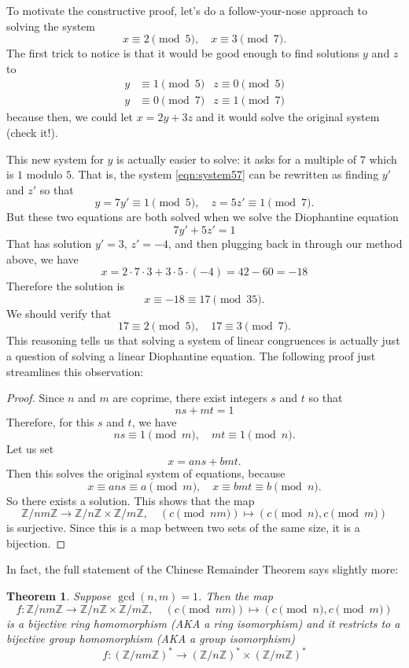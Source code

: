 \documentclass{article}
\theoremstyle{plain}
\newtheorem{theorem}{Theorem}
\theoremstyle{definition}
\theoremstyle{remark}
\numberwithin{theorem}{section}
\newcommand{\ZZ}{\mathbb{Z}}
\begin{document}
To motivate the constructive proof, let's do a follow-your-nose approach to solving the system
\[
x \equiv 2 \pmod{5}, \quad x \equiv 3 \pmod{7}.
\]
The first trick to notice is that it would be good enough to find solutions $y$ and $z$ to
\begin{align}
\label{eqn:system57}
y &\equiv 1 \pmod 5 & z \equiv 0 \pmod 5 \\
y &\equiv 0 \pmod 7 & z \equiv 1 \pmod 7
\end{align}
because then, we could let $x = 2y + 3z$ and it would solve the original system (check it!).

This new system for $y$ is actually easier to solve:  it asks for a multiple of $7$ which is $1$ modulo $5$.  That is, the system \eqref{eqn:system57} can be rewritten as finding $y'$ and $z'$ so that
\[
y  = 7y' \equiv 1 \pmod{5}, \quad z = 5z' \equiv 1 \pmod{7}.
\]
But these two equations are both solved when we solve the Diophantine equation
\[
7y' + 5z' = 1
\]
That has solution $y'= 3$, $z' = -4$, and then plugging back in through our method above, we have
\[
x =  2 \cdot 7 \cdot 3 + 3 \cdot 5 \cdot (-4) = 42 - 60 = -18
\]
Therefore the solution is
\[
x \equiv -18 \equiv 17 \pmod{35}.
\]
We should verify that
\[
17 \equiv 2 \pmod{5}, \quad 17 \equiv 3 \pmod{7}.
\]
This reasoning tells us that solving a system of linear congruences is actually just a question of solving a linear Diophantine equation.  The following proof just streamlines this observation:

\begin{proof}
Since $n$ and $m$ are coprime, there exist integers $s$ and $t$ so that 
\[
ns + mt = 1
\]
Therefore, for this $s$ and $t$, we have
\[
ns \equiv 1 \pmod{m}, \quad mt \equiv 1 \pmod{n}.
\]
Let us set
\[
x = ans + bmt.
\]
Then this solves the original system of equations, because
\[
x \equiv ans \equiv a \pmod{m}, \quad
x \equiv bmt \equiv b \pmod{n}.
\]
So there exists a solution.  This shows that the map
\[
\ZZ/nm\ZZ \rightarrow
\ZZ/n\ZZ \times \ZZ/m\ZZ, \quad
(c \pmod {nm}) \mapsto  (c \pmod{n}, c\pmod{m} )
\]
is surjective.  Since this is a map between two sets of the same size, it is a bijection.
\end{proof}

In fact, the full statement of the Chinese Remainder Theorem says slightly more:
\begin{theorem}
Suppose $\gcd(n,m)=1$.  Then the map
\[
f: \ZZ/nm\ZZ \rightarrow
\ZZ/n\ZZ \times \ZZ/m\ZZ, \quad
(c \pmod {nm}) \mapsto  (c \pmod{n}, c\pmod{m} )
\]
is a bijective ring homomorphism (AKA a ring isomorphism) and it restricts to a bijective group homomorphism (AKA a group isomorphism)
\[
f: (\ZZ/nm\ZZ)^* \rightarrow
(\ZZ/n\ZZ)^* \times (\ZZ/m\ZZ)^*
\]
\end{theorem}
\end{document}
